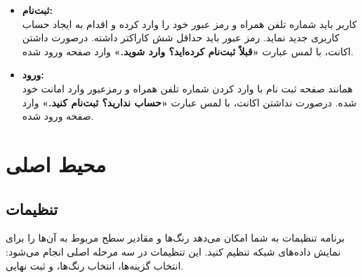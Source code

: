 \documentclass{report}
\begin{document}
\begin{itemize}
	\item \textbf{ثبت‌نام:}\\
	کاربر باید شماره تلفن همراه و رمز عبور خود را وارد کرده و اقدام به ایجاد حساب کاربری جدید نماید. رمز عبور باید حداقل شش کاراکتر داشته. درصورت داشتن اکانت، با لمس عبارت \textbf{«قبلاً ثبت‌نام کرده‌اید؟ وارد شوید.»} وارد صفحه ورود  شده.
	
	\item \textbf{ورود:}\\
	همانند صفحه ثبت نام با وارد کردن شماره تلفن همراه و رمزعبور وارد امانت خود شده. درصورت نداشتن اکانت، با لمس عبارت \textbf{«حساب ندارید؟ ثبت‌نام کنید.»} وارد صفحه ورود  شده.
\end{itemize}

\section{محیط اصلی}

\subsection{تنظیمات}

برنامه تنظیمات به شما امکان می‌دهد رنگ‌ها و مقادیر سطح مربوط به آن‌ها را برای نمایش داده‌های شبکه تنظیم کنید. 
این تنظیمات در سه مرحله اصلی انجام می‌شود: انتخاب گزینه‌ها، انتخاب رنگ‌ها، و ثبت نهایی. 
\end{document}

